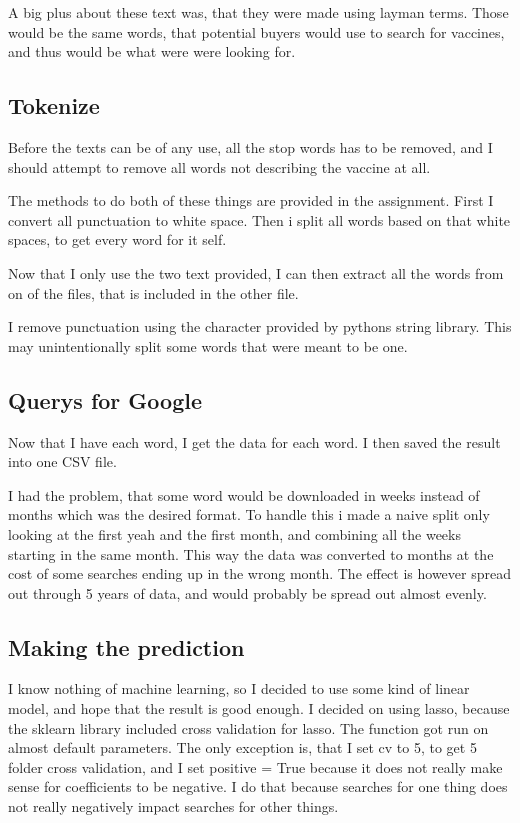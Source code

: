 \documentclass{sig-alternate}
\begin{document}
A big plus about these text was, that they were made using layman terms. Those would be the same words, that potential buyers would use to search for vaccines, and thus would be what were were looking for.

\subsection*{Tokenize}
Before the texts can be of any use, all the stop words has to be removed, and I should attempt to remove all words not describing the vaccine at all. 

The methods to do both of these things are provided in the assignment. First I convert all punctuation to white space. Then i split all words based on that white spaces, to get every word for it self.

Now that I only use the two text provided, I can then extract all the words from on of the files, that is included in the other file.

I remove punctuation using the character provided by pythons string library. This may unintentionally split some words that were meant to be one.

\subsection*{Querys for Google}
Now that I have each word, I get the data for each word. I then saved the result into one CSV file.

I had the problem, that some word would be downloaded in weeks instead of months which was the desired format. To handle this i made a naive split only looking at the first yeah and the first month, and combining all the weeks starting in the same month. This way the data was converted to months at the cost of some searches ending up in the wrong month. The effect is however spread out through 5 years of data, and would probably be spread out almost evenly.

\subsection*{Making the prediction}
I know nothing of machine learning, so I decided to use some kind of linear model, and hope that the result is good enough. I decided on using lasso, because the sklearn library included cross validation for lasso. The function got run on  almost default parameters. The only exception is, that I set cv to 5, to get 5 folder cross validation, and I set positive = True because it does not really make sense for coefficients to be negative. I do that because searches for one thing does not really negatively impact searches for other things.
\end{document}
